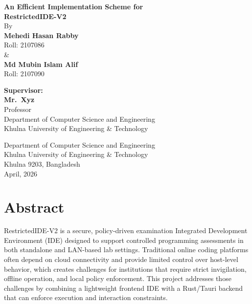 \documentclass[12pt,a4paper]{report}
\begin{document}
	\begin{titlepage}
		\begin{center}
			{\LARGE \textbf{An Efficient Implementation Scheme for}}\\[0.7\baselineskip]
			{\LARGE \textbf{RestrictedIDE-V2}}\\[2\baselineskip]
			
			{\large By}\\[1.5\baselineskip]
			{\large \textbf{Mehedi Hasan Rabby}}\\
			{\large Roll: 2107086}\\[0.5\baselineskip]
			{\large \&}\\[0.5\baselineskip]
			{\large \textbf{Md Mubin Islam Alif}}\\
			{\large Roll: 2107090}\\[3\baselineskip]
			
			\begin{flushleft}
				\textbf{Supervisor:}\\
				\textbf{Mr.~Xyz}\\
				Professor\\
				Department of Computer Science and Engineering\\
				Khulna University of Engineering \& Technology
			\end{flushleft}
			
			\vfill
			{\large Department of Computer Science and Engineering}\\
			{\large Khulna University of Engineering \& Technology}\\
			{\large Khulna 9203, Bangladesh}\\
			{\large April, 2026}
		\end{center}
	\end{titlepage}
	
	
	\chapter*{Abstract}
	
	RestrictedIDE-V2 is a secure, policy-driven examination Integrated Development Environment (IDE) designed to support controlled programming assessments in both standalone and LAN-based lab settings. Traditional online coding platforms often depend on cloud connectivity and provide limited control over host-level behavior, which creates challenges for institutions that require strict invigilation, offline operation, and local policy enforcement. This project addresses those challenges by combining a lightweight frontend IDE with a Rust/Tauri backend that can enforce execution and interaction constraints.
	
\end{document}
